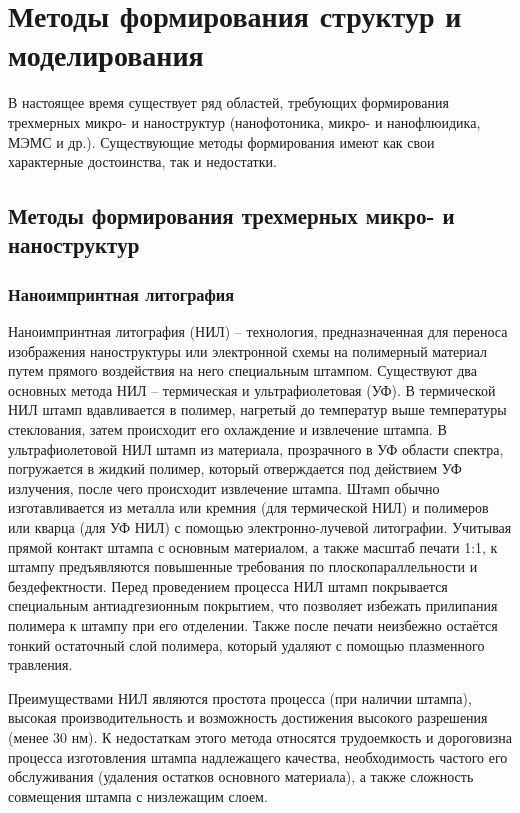 \chapter{Методы формирования структур и моделирования} \label{chapter:methods}

В настоящее время существует ряд областей, требующих формирования трехмерных микро- и наноструктур (нанофотоника, микро- и нанофлюидика, МЭМС и др.). Существующие методы формирования имеют как свои характерные достоинства, так и недостатки.

\section{Методы формирования трехмерных микро- и наноструктур}

\subsection{Наноимпринтная литография}
Наноимпринтная литография (НИЛ) -- технология, предназначенная для переноса изображения наноструктуры или электронной схемы на полимерный материал путем прямого воздействия на него специальным штампом. Существуют два основных метода НИЛ -- термическая и ультрафиолетовая (УФ). В термической НИЛ штамп вдавливается в полимер, нагретый до температур выше температуры стеклования, затем происходит его охлаждение и извлечение штампа. В ультрафиолетовой НИЛ штамп из материала, прозрачного в УФ области спектра, погружается в жидкий полимер, который отверждается под действием УФ излучения, после чего происходит извлечение штампа. Штамп обычно изготавливается из металла или кремния (для термической НИЛ) и полимеров или кварца (для УФ НИЛ) с помощью электронно-лучевой литографии. Учитывая прямой контакт штампа с основным материалом, а также масштаб печати 1:1, к штампу предъявляются повышенные требования по плоскопараллельности и бездефектности.  Перед проведением процесса НИЛ штамп покрывается специальным антиадгезионным покрытием, что позволяет избежать прилипания полимера к штампу при его отделении. Также после печати неизбежно остаётся тонкий остаточный слой полимера, который удаляют с помощью плазменного травления.

Преимуществами НИЛ являются простота процесса (при наличии штампа), высокая производительность и возможность достижения высокого разрешения (менее 30 нм). К недостаткам этого метода относятся трудоемкость и дороговизна процесса изготовления штампа надлежащего качества, необходимость частого его обслуживания (удаления остатков основного материала), а также сложность совмещения штампа с низлежащим слоем.


